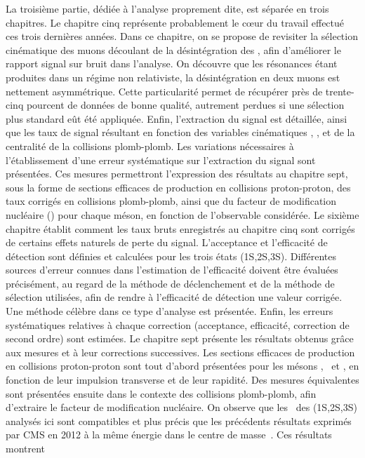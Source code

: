 La troisième partie, dédiée à l'analyse proprement dite, est séparée
en trois chapitres. Le chapitre cinq représente probablement le c\oe{}ur
du travail effectué ces trois dernières années. Dans ce chapitre, on
se propose de revisiter la sélection cinématique des muons découlant
de la désintégration des \PgU, afin d'améliorer le rapport signal sur
bruit dans l'analyse. On découvre que les résonances étant produites
dans un régime non relativiste, la désintégration en deux muons est
nettement asymmétrique. Cette particularité permet de récupérer près
de trente-cinq pourcent de données de bonne qualité, autrement
perdues si une sélection plus standard eût été appliquée. Enfin,
l'extraction du signal est détaillée, ainsi que les taux de signal
résultant en fonction des variables cinématiques \pt, \y, et de la
centralité de la collisions plomb-plomb. Les variations nécessaires à
l'établissement d'une erreur systématique sur l'extraction du signal
sont présentées. Ces mesures permettront l'expression des
résultats au chapitre sept, sous la forme de sections efficaces de production en collisions
proton-proton, des taux corrigés en
collisions plomb-plomb, ainsi que du facteur de modification nucléaire
(\RAA) pour chaque méson, en fonction de l'observable considérée.
Le sixième chapitre établit comment les taux bruts enregistrés au
chapitre cinq sont corrigés de certains effets naturels de perte du
signal. L'acceptance et l'efficacité de détection sont définies et
calculées pour les trois états \PgU(1S,2S,3S). Différentes sources d'erreur
connues dans l'estimation de l'efficacité doivent être évaluées
précisément, au regard de la méthode de déclenchement et de la méthode
de sélection utilisées, afin de rendre à l'efficacité de détection une
valeur corrigée. Une méthode célèbre dans ce type d'analyse est
présentée. Enfin, les erreurs systématiques relatives à chaque
correction (acceptance, efficacité, correction de second ordre) sont
estimées.
Le chapitre sept présente les résultats obtenus grâce aux mesures et à
leur corrections successives. Les sections efficaces de production en
collisions proton-proton sont tout d'abord présentées pour les mésons
\PgUa, \PgUb\ et \PgUc, en fonction de leur impulsion transverse et de
leur rapidité. Des mesures équivalentes sont présentées ensuite dans
le contexte des collisions plomb-plomb, afin d'extraire le facteur de
modification nucléaire. On observe que les \RAA\ des \PgU(1S,2S,3S)
analysés ici sont compatibles et plus précis que les précédents
résultats exprimés par CMS en 2012 à la même énergie dans le centre de
masse~\cite{torsten,HIN-11-007,11-011}. Ces résultats montrent
